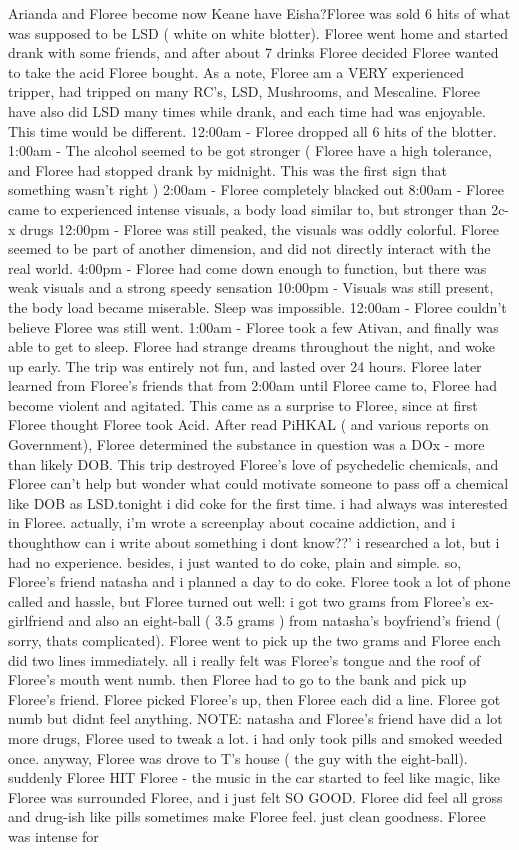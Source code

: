 \documentclass[12pt]{book}
\begin{document}
Arianda and Floree become now Keane have Eisha?Floree was sold 6 hits of what was supposed to be LSD ( white on white blotter). Floree went home and started drank with some friends, and after about 7 drinks Floree decided Floree wanted to take the acid Floree bought. As a note, Floree am a VERY experienced tripper, had tripped on many RC's, LSD, Mushrooms, and Mescaline. Floree have also did LSD many times while drank, and each time had was enjoyable. This time would be different. 12:00am - Floree dropped all 6 hits of the blotter. 1:00am - The alcohol seemed to be got stronger ( Floree have a high tolerance, and Floree had stopped drank by midnight. This was the first sign that something wasn't right ) 2:00am - Floree completely blacked out 8:00am - Floree came to experienced intense visuals, a body load similar to, but stronger than 2c-x drugs 12:00pm - Floree was still peaked, the visuals was oddly colorful. Floree seemed to be part of another dimension, and did not directly interact with the real world. 4:00pm - Floree had come down enough to function, but there was weak visuals and a strong speedy sensation 10:00pm - Visuals was still present, the body load became miserable. Sleep was impossible. 12:00am - Floree couldn't believe Floree was still went. 1:00am - Floree took a few Ativan, and finally was able to get to sleep. Floree had strange dreams throughout the night, and woke up early. The trip was entirely not fun, and lasted over 24 hours. Floree later learned from Floree's friends that from 2:00am until Floree came to, Floree had become violent and agitated. This came as a surprise to Floree, since at first Floree thought Floree took Acid. After read PiHKAL ( and various reports on Government), Floree determined the substance in question was a DOx - more than likely DOB. This trip destroyed Floree's love of psychedelic chemicals, and Floree can't help but wonder what could motivate someone to pass off a chemical like DOB as LSD.tonight i did coke for the first time. i had always was interested in Floree. actually, i'm wrote a screenplay about cocaine addiction, and i thoughthow can i write about something i dont know??' i researched a lot, but i had no experience. besides, i just wanted to do coke, plain and simple. so, Floree's friend natasha and i planned a day to do coke. Floree took a lot of phone called and hassle, but Floree turned out well: i got two grams from Floree's ex-girlfriend and also an eight-ball ( 3.5 grams ) from natasha's boyfriend's friend ( sorry, thats complicated). Floree went to pick up the two grams and Floree each did two lines immediately. all i really felt was Floree's tongue and the roof of Floree's mouth went numb. then Floree had to go to the bank and pick up Floree's friend. Floree picked Floree's up, then Floree each did a line. Floree got numb but didnt feel anything. NOTE: natasha and Floree's friend have did a lot more drugs, Floree used to tweak a lot. i had only took pills and smoked weeded once. anyway, Floree was drove to T's house ( the guy with the eight-ball). suddenly Floree HIT Floree - the music in the car started to feel like magic, like Floree was surrounded Floree, and i just felt SO GOOD. Floree did feel all gross and drug-ish like pills sometimes make Floree feel. just clean goodness. Floree was intense for 
\end{document}
